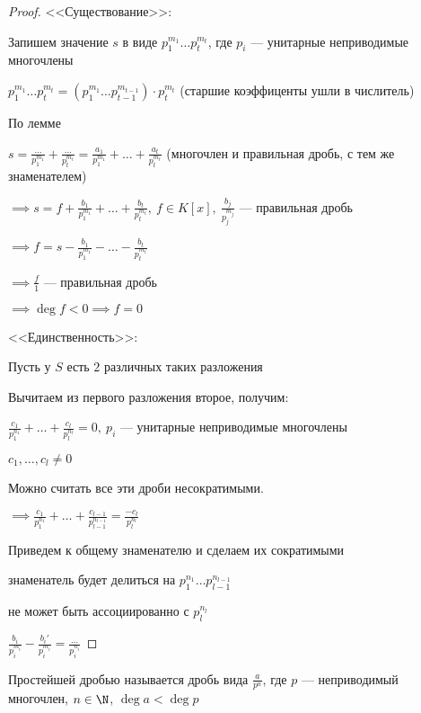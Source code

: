 \begin{proof}
    <<Существование>>:

    Запишем значение $s$ в виде $p_1^{m_1} \ldots p_t^{m_t}$, где $p_i$ --- унитарные неприводимые многочлены

    $p_1^{m_1} \ldots p_t^{m_t} = (p_1^{m_1} \ldots p_{t-1}^{m_{t-1}}) \cdot p_t^{m_t}$ (старшие коэффиценты ушли в числитель)

    По лемме

    $s = \frac{\ldots}{p_1^{m_1}} + \frac{\ldots}{p_t^{m_t}} = \frac{a_1}{p_1^{m_1}} + \ldots + \frac{a_t}{p_t^{m_t}}$ (многочлен и правильная дробь, с тем же знаменателем)

    $\implies s = f + \frac{b_1}{p_1^{m_1}} + \ldots + \frac{b_t}{p_t^{m_t}},~f \in K[x],~\frac{b_j}{p_j^{m_j}}$ --- правильная дробь

    $\implies f = s - \frac{b_1}{p_1^{m_1}} - \ldots - \frac{b_t}{p_t^{m_t}}$

    $\implies \frac{f}{1}$ --- правильная дробь

    $\implies \deg f < 0 \implies f = 0$

    <<Единственность>>:
    
    Пусть у $S$ есть $2$ различных таких разложения

    Вычитаем из первого разложения второе, получим:

    $\frac{c_1}{p_1^{n_1}} + \ldots + \frac{c_l}{p_l^{n_l}} = 0,~p_i$ --- унитарные неприводимые многочлены

    $c_1, \ldots, c_l \neq 0$

    Можно считать все эти дроби несократимыми.

    $\implies \frac{c_1}{p_1^{n_1}} + \ldots + \frac{c_{l-1}}{p_{l-1}^{n_{l-1}}} = \frac{-c_l}{p_l^{n_l}}$

    Приведем к общему знаменателю и сделаем их сократимыми

    знаменатель будет делиться на $p_1^{n_1} \ldots p_{l-1}^{n_{l-1}}$

    не может быть ассоциированно с $p_l^{n_l}$

    $\frac{b_i}{p_i^{m_i}} - \frac{b_i'}{p_i^{m_i}} = \frac{\ldots}{p_i^{n_i}}$
\end{proof}

\begin{defn}
    Простейшей дробью называется дробь вида $\frac{a}{p^n}$, где $p$ --- неприводимый многочлен, $n \in \N$, $\deg a < \deg p$
\end{defn}

